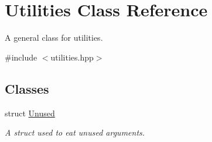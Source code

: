\hypertarget{class_utilities}{\section{Utilities Class Reference}
\label{class_utilities}
}


A general class for utilities.  




{\ttfamily \#include $<$utilities.\-hpp$>$}

\subsection*{Classes}
\begin{DoxyCompactItemize}
\item 
struct \hyperlink{struct_utilities_1_1_unused}{Unused}
\begin{DoxyCompactList}\small\item\em A struct used to eat unused arguments. \end{DoxyCompactList}\end{DoxyCompactItemize}
